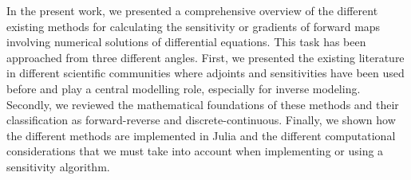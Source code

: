 In the present work, we presented a comprehensive overview of the different existing methods for calculating the sensitivity or gradients of forward maps involving numerical solutions of differential equations.
This task has been approached from three different angles.
First, we presented the existing literature in different scientific communities where adjoints and sensitivities have been used before and play a central modelling role, especially for inverse modeling.
Secondly, we reviewed the mathematical foundations of these methods and their classification as forward-reverse and discrete-continuous.
Finally, we shown how the different methods are implemented in Julia and the different computational considerations that we must take into account when implementing or using a sensitivity algorithm.



